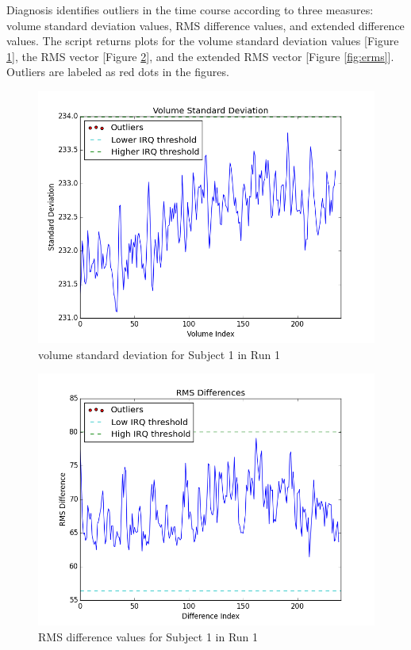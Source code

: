\par \indent Diagnosis identifies outliers in the time course according to
three measures: volume standard deviation values, RMS difference values, and
extended difference values. The script returns plots for the volume standard
deviation values [Figure \ref{fig:vol_std}], the RMS vector [Figure \ref{fig:rms}], and the extended RMS vector [Figure \ref{fig:erms}]. Outliers are labeled as red dots in the figures.

\begin{figure}[h!]
\centering
\includegraphics[width=120mm]{images/vol_std.png}
\caption{volume standard deviation for Subject 1 in Run 1}
\label{fig:vol_std}
\end{figure}

\begin{figure}[h!]
\centering
\includegraphics[width=120mm]{images/vol_rms_outliers.png}
\caption{RMS difference values for Subject 1 in Run 1}
\label{fig:rms}
\end{figure}

